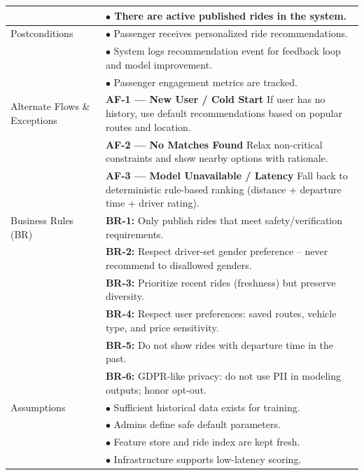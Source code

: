 \begin{longtable}{|>{\raggedright\arraybackslash}p{4cm}|>{\raggedright\arraybackslash}p{11cm}|}
& $\bullet$ There are active published rides in the system. \\
\hline
Postconditions & $\bullet$ Passenger receives personalized ride recommendations. \\
& $\bullet$ System logs recommendation event for feedback loop and model improvement. \\
& $\bullet$ Passenger engagement metrics are tracked. \\
\hline
Alternate Flows \& Exceptions & \textbf{AF-1 — New User / Cold Start} \newline If user has no history, use default recommendations based on popular routes and location. \\
& \textbf{AF-2 — No Matches Found} \newline Relax non-critical constraints and show nearby options with rationale. \\
& \textbf{AF-3 — Model Unavailable / Latency} \newline Fall back to deterministic rule-based ranking (distance + departure time + driver rating). \\
\hline
Business Rules (BR) & \textbf{BR-1:} Only publish rides that meet safety/verification requirements. \\
& \textbf{BR-2:} Respect driver-set gender preference – never recommend to disallowed genders. \\
& \textbf{BR-3:} Prioritize recent rides (freshness) but preserve diversity. \\
& \textbf{BR-4:} Respect user preferences: saved routes, vehicle type, and price sensitivity. \\
& \textbf{BR-5:} Do not show rides with departure time in the past. \\
& \textbf{BR-6:} GDPR-like privacy: do not use PII in modeling outputs; honor opt-out. \\
\hline
Assumptions & $\bullet$ Sufficient historical data exists for training. \\
& $\bullet$ Admins define safe default parameters. \\
& $\bullet$ Feature store and ride index are kept fresh. \\
& $\bullet$ Infrastructure supports low-latency scoring. \\
\hline
\end{longtable}

